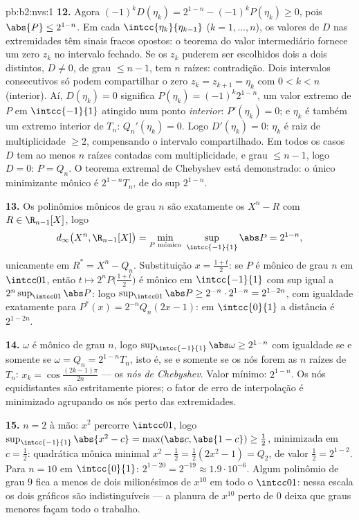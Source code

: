 \begin{solution}{pb:b2:nvs:1}
\textbf{12.} Agora $(-1)^kD(\eta_k) = 2^{1-n} - (-1)^kP(\eta_k)
\geq 0$, pois $\abs{P} \leq 2^{1-n}$. Em cada
$\intcc{\eta_k}{\eta_{k-1}}$ ($k = 1, \dots, n$), os valores de $D$ nas
extremidades têm sinais fracos opostos: o teorema do valor
intermediário fornece um zero $z_k$ no intervalo fechado. Se os $z_k$
puderem ser escolhidos dois a dois distintos, $D \neq 0$, de grau $\leq n-1$,
tem $n$ raízes: contradição. Dois intervalos consecutivos só podem
compartilhar o zero $z_k = z_{k+1} = \eta_k$ com $0 < k < n$
(interior). Aí, $D(\eta_k) = 0$ significa $P(\eta_k) =
(-1)^k2^{1-n}$, um valor extremo de $P$ em $\intcc{-1}{1}$
atingido num ponto \emph{interior}: $P'(\eta_k) = 0$; e
$\eta_k$ é também um extremo interior de $T_n$: $Q_n'(\eta_k) =
0$. Logo $D'(\eta_k) = 0$: $\eta_k$ é raiz de multiplicidade
$\geq 2$, compensando o intervalo compartilhado. Em todos os casos $D$ tem
ao menos $n$ raízes contadas com multiplicidade, e grau $\leq n -
1$, logo $D = 0$: $P = Q_n$. O teorema extremal de Chebyshev está
demonstrado: o único minimizante mônico é $2^{1-n}T_n$, de  do sup
$2^{1-n}$.

\textbf{13.} Os polinômios mônicos de grau $n$ são exatamente os
$X^n - R$ com $R \in \R_{n-1}[X]$, logo
\[
d_\infty\bigl(X^n, \R_{n-1}[X]\bigr) = \min_{P \text{
mônico}}\ \sup_{\intcc{-1}{1}}\abs P = 2^{1-n},
\]
unicamente em $R^* = X^n - Q_n$. Substituição $x = \frac{1+t}2$:
se $P$ é mônico de grau $n$ em $\intcc01$, então $t \mapsto
2^nP\bigl(\frac{1+t}2\bigr)$ é mônico em $\intcc{-1}{1}$ com
sup igual a $2^n\sup_{\intcc01}\abs P$: logo
$\sup_{\intcc01}\abs P \geq 2^{-n}\cdot2^{1-n} = 2^{1-2n}$, com
igualdade exatamente para $P^*(x) = 2^{-n}Q_n(2x - 1)$: em
$\intcc{0}{1}$ a distância é $2^{1-2n}$.

\textbf{14.} $\omega$ é mônico de grau $n$, logo
$\sup_{\intcc{-1}{1}}\abs\omega \geq 2^{1-n}$ com igualdade se e somente se
$\omega = Q_n = 2^{1-n}T_n$, isto é, se e somente se os nós forem as $n$
raízes de $T_n$: $x_k = \cos\frac{(2k-1)\pi}{2n}$ --- os
\emph{nós de Chebyshev}. Valor mínimo: $2^{1-n}$. Os nós
equidistantes são estritamente piores; o fator de erro de interpolação é
minimizado agrupando os nós perto das extremidades.

\textbf{15.} $n = 2$ à mão: $x^2$ percorre $\intcc01$, logo
$\sup_{\intcc{-1}{1}}\abs{x^2 - c} = \max(\abs c, \abs{1 - c})
\geq \frac12$, minimizada em $c = \frac12$: quadrática mônica
minimal $x^2 - \frac12 = \frac12(2x^2 - 1) = Q_2$, de valor
$\frac12 = 2^{1-2}$. Para $n = 10$ em $\intcc{0}{1}$: $2^{1-20} =
2^{-19} \approx 1.9\cdot10^{-6}$. Algum polinômio de grau $9$
fica a menos de dois milionésimos de $x^{10}$ em todo o
$\intcc01$: nessa escala os dois gráficos são indistinguíveis
--- a planura de $x^{10}$ perto de $0$ deixa que graus menores façam todo
o trabalho.


\end{solution}
